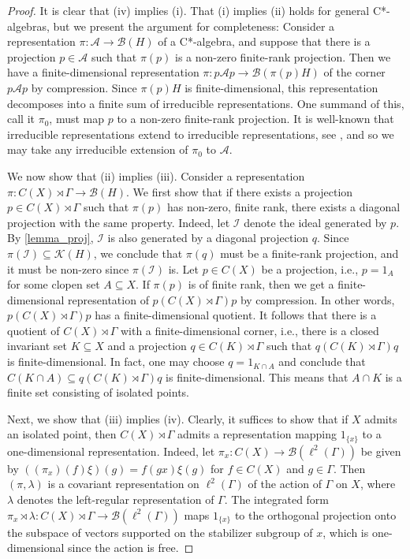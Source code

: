 \documentclass[12pt, a4paper, oneside]{amsart}
\newcommand{\0}{\mathbf{0}}
\newcommand{\1}{\mathbf{1}}
\newcommand{\A}{\mathscr{A}}
\newcommand{\B}{\mathscr{B}}
\newcommand{\I}{\mathscr{I}}
\newcommand{\K}{\mathscr{K}}
\begin{document}
	\begin{proof}
		It is clear that (iv) implies (i). That (i) implies (ii) holds for general C*-algebras, but we present the argument for completeness: Consider a representation \(\pi \colon \A \to \B(H)\) of a C*-algebra, and suppose that there is a projection \(p \in \A\) such that \(\pi(p)\) is a non-zero finite-rank projection. Then we have a finite-dimensional representation \(\pi \colon p \A p \to \B(\pi(p)H)\) of the corner \(p \A p\) by compression. Since \(\pi(p)H\) is finite-dimensional, this representation decomposes into a finite sum of irreducible representations. One summand of this, call it \(\pi_0\), must map \(p\) to a non-zero finite-rank projection. It is well-known that irreducible representations extend to irreducible representations, see \cite[Theorem 5.5.1]{murphy}, and so we may take any irreducible extension of \(\pi_0\) to \(\A\). 
		
		We now show that (ii) implies (iii). Consider a representation \(\pi \colon C(X) \rtimes \Gamma \to \B(H)\). We first show that if there exists a projection \(p \in C(X) \rtimes \Gamma\) such that \(\pi(p)\) has non-zero, finite rank, there exists a diagonal projection with the same property. Indeed, let \(\I\) denote the ideal generated by \(p\). By \cref{lemma_proj}, \(\I\) is also generated by a diagonal projection \(q\). Since \(\pi(\I) \subseteq \K(H)\), we conclude that \(\pi(q)\) must be a finite-rank projection, and it must be non-zero since \(\pi(\I)\) is. Let \(p \in C(X)\) be a projection, i.e., \(p = 1_A\) for some clopen set \(A \subseteq X\). If \(\pi(p)\) is of finite rank, then we get a finite-dimensional representation of \(p (C(X) \rtimes \Gamma) p\) by compression. In other words, \(p (C(X) \rtimes \Gamma) p\) has a finite-dimensional quotient. It follows that there is a quotient of $C(X) \rtimes \Gamma$ with a finite-dimensional corner, i.e., there is a closed invariant set \(K \subseteq X\) and a projection \(q \in C(K) \rtimes \Gamma\) such that \(q (C(K) \rtimes \Gamma) q\) is finite-dimensional. In fact, one may choose \(q = 1_{K \cap A}\) and conclude that \(C(K \cap A) \subseteq q (C(K) \rtimes \Gamma) q\) is finite-dimensional. This means that \(A \cap K\) is a finite set consisting of isolated points. 
		
		Next, we show that (iii) implies (iv). Clearly, it suffices to show that if \(X\) admits an isolated point, then \(C(X) \rtimes \Gamma\) admits a representation mapping \(1_{\{x\}}\) to a one-dimensional representation. Indeed, let \(\pi_x \colon C(X) \to \B(\ell^2(\Gamma))\) be given by \( \left( (\pi_x)(f)\xi \right) (g) = f(gx) \xi (g)\) for \(f \in C(X)\) and \(g \in \Gamma\). Then \((\pi, \lambda)\) is a covariant representation on \(\ell^2(\Gamma)\) of the action of \(\Gamma\) on \(X\), where \(\lambda\) denotes the left-regular representation of \(\Gamma\). The integrated form \(\pi_x \rtimes \lambda \colon C(X) \rtimes \Gamma \to \B(\ell^2(\Gamma))\) maps \(1_{\{x\}}\) to the orthogonal projection onto the subspace of vectors supported on the stabilizer subgroup of \(x\), which is one-dimensional since the action is free.
	\end{proof}
	
\end{document}
